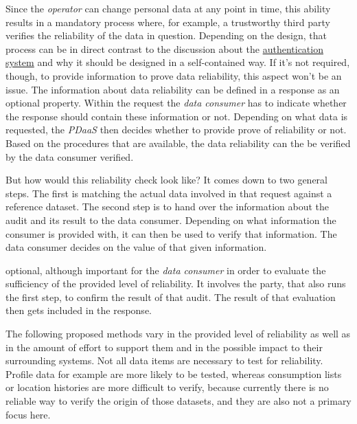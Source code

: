 \documentclass[12pt,english,a4paper,titlepage,cleardoublepage=empty,dottedtoc]{report}
\begin{document}
Since the \emph{operator} can change personal data at any point in time,
this ability results in a mandatory process where, for example, a
trustworthy third party verifies the reliability of the data in
question. Depending on the design, that process can be in direct
contrast to the discussion about the
\protect\hyperlink{authentication}{authentication system} and why it
should be designed in a self-contained way. If it's not required,
though, to provide information to prove data reliability, this aspect
won't be an issue. The information about data reliability can be defined
in a response as an optional property. Within the request the \emph{data
consumer} has to indicate whether the response should contain these
information or not. Depending on what data is requested, the
\emph{PDaaS} then decides whether to provide prove of reliability or
not. Based on the procedures that are available, the data reliability
can the be verified by the data consumer verified.

But how would this reliability check look like? It comes down to two
general steps. The first is matching the actual data involved in that
request against a reference dataset. The second step is to hand over the
information about the audit and its result to the data consumer.
Depending on what information the consumer is provided with, it can then
be used to verify that information. The data consumer decides on the
value of that given information.

optional, although important for the \emph{data consumer} in order to
evaluate the sufficiency of the provided level of reliability. It
involves the party, that also runs the first step, to confirm the result
of that audit. The result of that evaluation then gets included in the
response.

The following proposed methods vary in the provided level of reliability
as well as in the amount of effort to support them and in the possible
impact to their surrounding systems. Not all data items are necessary to
test for reliability. Profile data for example are more likely to be
tested, whereas consumption lists or location histories are more
difficult to verify, because currently there is no reliable way to
verify the origin of those datasets, and they are also not a primary
focus here.
\end{document}
